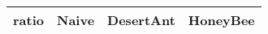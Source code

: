 \begin{tabular} {|l|l|l|l|}
\hline
ratio & Naive & DesertAnt & HoneyBee \\
\hline
\hline
\end{tabular}
